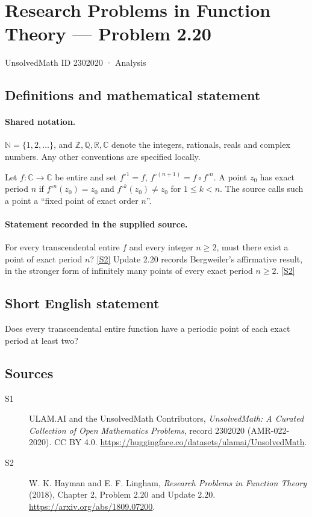 \documentclass[11pt]{article}
\newcommand{\sref}[2]{\hyperlink{source:#1:#2}{[S#2]}}
\begin{document}
\setcounter{section}{2302019}
\section{Research Problems in Function Theory — Problem 2.20}\label{2302020}
{\small\sffamily UnsolvedMath ID 2302020 · Analysis}
\subsection{Definitions and mathematical statement}

\paragraph{Shared notation.}$\mathbb N=\{1,2,\ldots\}$, and $\mathbb Z,\mathbb Q,\mathbb R,\mathbb C$ denote the integers, rationals, reals and complex numbers. Any other conventions are specified locally.


Let $f:\mathbb C\to\mathbb C$ be entire and set $f^{\circ1}=f$, $f^{\circ(n+1)}=f\circ f^{\circ n}$.
A point $z_0$ has exact period $n$ if $f^{\circ n}(z_0)=z_0$ and $f^{\circ k}(z_0)\ne z_0$ for $1\le k<n$.
The source calls such a point a ``fixed point of exact order $n$''.

\paragraph{Statement recorded in the supplied source.}
For every transcendental entire $f$ and every integer $n\ge2$, must there exist a point of exact period $n$? \sref{2302020}{2}
Update 2.20 records Bergweiler's affirmative result, in the stronger form of infinitely many points of every exact period $n\ge2$. \sref{2302020}{2}
\subsection{Short English statement}
Does every transcendental entire function have a periodic point of each exact period at least two?
\subsection{Sources}
\begin{description}
\item[\hypertarget{source:2302020:1}{S1}] ULAM.AI and the UnsolvedMath Contributors, \emph{UnsolvedMath: A Curated Collection of Open Mathematics Problems}, record 2302020 (AMR-022-2020). CC BY 4.0. \url{https://huggingface.co/datasets/ulamai/UnsolvedMath}.
\item[\hypertarget{source:2302020:2}{S2}] W. K. Hayman and E. F. Lingham, \emph{Research Problems in Function Theory} (2018), Chapter 2, Problem 2.20 and Update 2.20. \url{https://arxiv.org/abs/1809.07200}.
\end{description}
\label{end:2302020}
\end{document}
